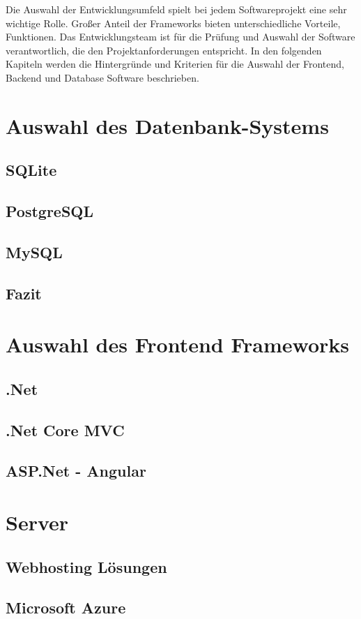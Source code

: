 Die Auswahl der Entwicklungsumfeld spielt bei jedem Softwareprojekt eine sehr
wichtige Rolle. Großer Anteil der Frameworks bieten unterschiedliche Vorteile,
Funktionen. 
Das Entwicklungsteam ist für die Prüfung und Auswahl der Software verantwortlich,
die den Projektanforderungen entspricht. In den folgenden Kapiteln werden
die Hintergründe und Kriterien für die Auswahl der Frontend, Backend und Database Software
beschrieben. 



\section{Auswahl des Datenbank-Systems}
        
    \subsection{SQLite}
        
        \newpage
    \subsection{PostgreSQL}
        
    \subsection{MySQL}
        
        \newpage
    \subsection{Fazit}
    \lipsum[5-8]
\section{Auswahl des Frontend Frameworks}
    \lipsum[5-12]
    \subsection{.Net}
        \lipsum[5-12]
    \subsection{.Net Core MVC}
        \lipsum[5-12]
    \subsection{ASP.Net - Angular}
        \lipsum[5-12]
\section{Server}
    \lipsum[5-12]
    \subsection{Webhosting Lösungen}
        \lipsum[5-12]
    \subsection{Microsoft Azure}
        \lipsum[5-12]

